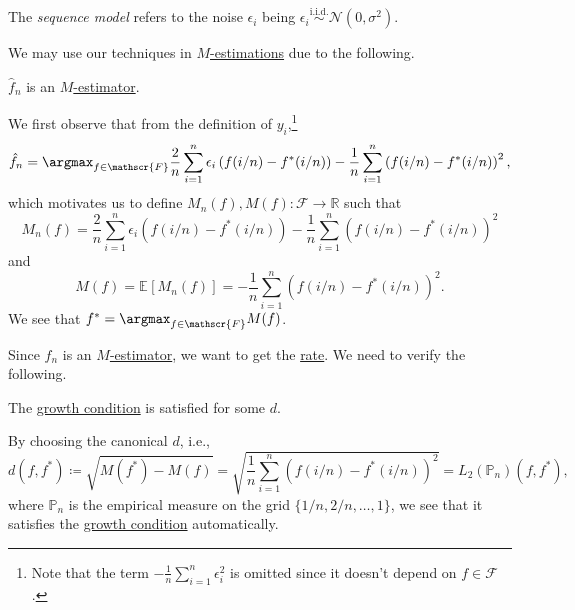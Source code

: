 \begin{notation}\label{not:sequence-model}
	The \emph{sequence model} refers to the noise \(\epsilon _i\) being \(\epsilon _i \overset{\text{i.i.d.} }{\sim } \mathcal{N} (0, \sigma ^2)\).
\end{notation}

We may use our techniques in \hyperref[prb:M-estimation]{\(M\)-estimations} due to the following.

\begin{remark}
	\(\hat{f} _n \) is an \hyperref[prb:M-estimation]{\(M\)-estimator}.
\end{remark}
\begin{explanation}
	We first observe that from the definition of \(y_i\),\footnote{Note that the term \(-\frac{1}{n} \sum_{i=1}^{n} \epsilon _i ^2\) is omitted since it doesn't depend on \(f \in \mathscr{F} \).}
	\[
		\hat{f} _n = \argmax_{f\in \mathscr{F} } \frac{2}{n} \sum_{i=1}^{n} \epsilon _i \left( f (i / n) - f^{\ast} (i / n)  \right) - \frac{1}{n} \sum_{i=1}^{n} \left( f (i / n) - f^{\ast} (i / n) \right) ^2 ,
	\]
	which motivates us to define \(M_n(f) , M(f) \colon \mathscr{F} \to \mathbb{R} \) such that
	\[
		M_n(f) = \frac{2}{n} \sum_{i=1}^{n} \epsilon _i \left( f (i / n) - f^{\ast} (i / n)  \right) - \frac{1}{n} \sum_{i=1}^{n} \left( f (i / n) - f^{\ast} (i / n) \right) ^2
	\]
	and
	\[
		M(f)
		= \mathbb{E}_{}\left[M_n (f) \right]
		= - \frac{1}{n} \sum_{i=1}^{n} \left( f (i / n) - f^{\ast} (i / n) \right) ^2.
	\]
	We see that \(f^{\ast} = \argmax_{f\in \mathscr{F} } M(f) \).
\end{explanation}

Since \(\hat{f} _n \) is an \hyperref[prb:M-estimation]{\(M\)-estimator}, we want to get the \hyperref[def:rate-of-convergence]{rate}. We need to verify the following.

\begin{claim}
	The \hyperref[def:growth-condition*]{growth condition} is satisfied for some \(d\).
\end{claim}
\begin{explanation}
	By choosing the canonical \(d\), i.e.,
	\[
		d(f, f^{\ast} )
		\coloneqq \sqrt{M(f^{\ast} ) - M(f)}
		= \sqrt{\frac{1}{n} \sum_{i=1}^{n} \left( f (i / n) - f^{\ast} (i / n)  \right) ^2}
		= L_2(\mathbb{P} _n) (f, f^{\ast} ),
	\]
	where \(\mathbb{P} _n\) is the empirical measure on the grid \(\{ 1 / n, 2 / n, \dots , 1 \} \), we see that it satisfies the \hyperref[def:growth-condition*]{growth condition} automatically.
\end{explanation}

